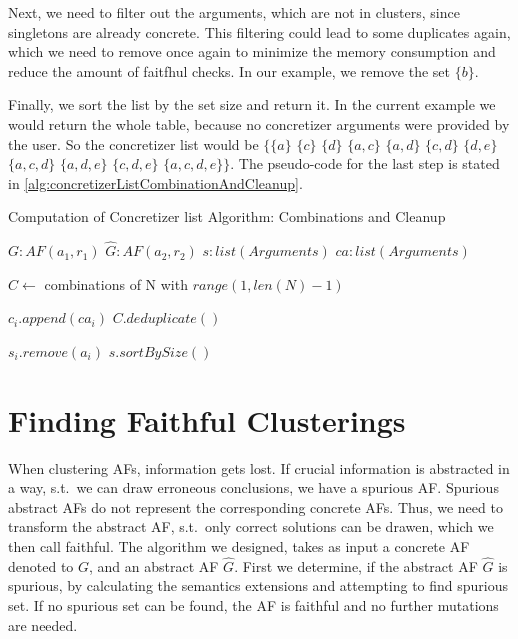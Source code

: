 Next, we need to filter out the arguments, which are not in clusters, since singletons are already concrete. This filtering could lead to some duplicates again, which we need to remove once again to minimize the memory consumption and reduce the amount of faitfhul checks. In our example, we remove the set $\{b\}$.

Finally, we sort the list by the set size and return it. In the current example we would return the whole table, because no concretizer arguments were provided by the user. So the concretizer list would be
$\bigl\{\{a\}$
$\{c\}$
$\{d\}$
$\{a, c\}$
$\{a, d\}$
$\{c, d\}$
$\{d, e\}$
$\{a, c, d\}$
$\{a, d, e\}$
$\{c, d, e\}$
$\{a, c, d, e\}\bigl\}$. The pseudo-code for the last step is stated in \cref{alg:concretizerListCombinationAndCleanup}.


\begin{algorithm}
    \caption{Computation of Concretizer list Algorithm: Combinations and Cleanup}\label{alg:concretizerListCombinationAndCleanup}
    \begin{algorithmic}[1]
        \Require $G: AF(a_1, r_1)$ 
        \Require $\hat{G}: AF(a_2, r_2)$ 
        \Require $s: list(Arguments)$ 
        \Require $ca: list(Arguments)$ 

        \State $C \gets$ combinations of N with $range(1, len(N)-1)$ 

         
                \State $c_i.append(ca_i)$
            \EndFor
        \EndFor
        \State $C.deduplicate()$

         
                    \State $s_i.remove(a_i)$
                \EndIf
            \EndFor
        \EndFor
        \State \Return $s.sortBySize()$
    \end{algorithmic}
\end{algorithm}

\newpage

\section{Finding Faithful Clusterings}
\label{sec:AlgorithmicApproachToComputeFaifthulClusterings}
When clustering AFs, information gets lost. If crucial information is abstracted in a way, s.t.\ we can draw erroneous conclusions, we have a spurious AF. Spurious abstract AFs do not represent the corresponding concrete AFs. Thus, we need to transform the abstract AF, s.t.\ only correct solutions can be drawen, which we then call faithful. The algorithm we designed, takes as input a concrete AF denoted to $G$, and an abstract AF $\hat{G}$. First we determine, if the abstract AF $\hat{G}$ is spurious, by calculating the semantics extensions and attempting to find spurious set. If no spurious set can be found, the AF is faithful and no further mutations are needed.


